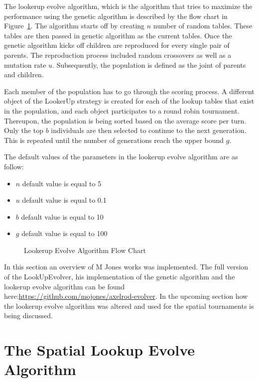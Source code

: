 The lookerup evolve algorithm, which is the algorithm that tries to maximize
the performance using the genetic algorithm is described by the flow chart in
Figure~\ref{fig:flookerup-evolve-flow}. The algorithm starts off by creating
\(n\) number of random tables. These tables are then passed in genetic algorithm
as the current tables.
Once the genetic algorithm kicks off children are reproduced for every single pair
of parents. The reproduction process included random crossovers as well as a
mutation rate \(u\). Subsequently, the population is defined as the joint of
parents and children.

Each member of the population has to go through the scoring process. A different
object of the LookerUp strategy is created for each of the lookup tables that
exist in the population, and each object participates to a round robin tournament.
Thereupon, the population is being sorted based on the average score per turn.
Only the top \(b\) individuals are then selected to continue to the next generation.
This is repeated until the number of generations reach the upper bound \(g\).

The default values of the parameters in the lookerup evolve algorithm are as
follow:
\begin{itemize}
  \item \(n\) default value is equal to 5
  \item \(u\) default value is equal to 0.1
  \item \(b\) default value is equal to 10
  \item \(g\) default value is equal to 100
\end{itemize}

\begin{figure}[!hbtp]
		
		\caption{Lookerup Evolve Algorithm Flow Chart}
  \label{fig:flookerup-evolve-flow}
\end{figure}

In this section an overview of M Jones works was implemented. The full version
of the LookUpEvolver, his implementation of the genetic algorithm and the lookerup evolve
algorithm can be found here:\url{https://github.com/mojones/axelrod-evolver}.
In the upcoming section how the lookerup evolve algorithm was altered and used
for the spatial tournaments is being discussed.

\section{The Spatial Lookup Evolve Algorithm}

